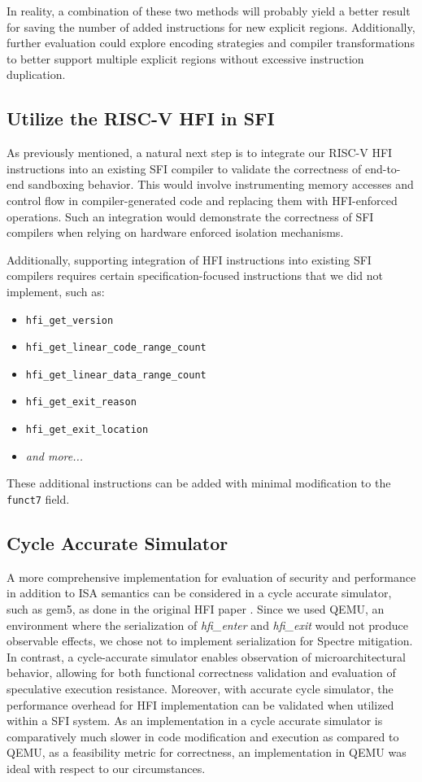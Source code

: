 \documentclass[conference,compsoc]{IEEEtran}
\begin{document}
In reality, a combination of these two methods will probably yield a better result for saving the number of added instructions for new explicit regions.
Additionally, further evaluation could explore encoding strategies and compiler transformations to better support multiple explicit regions without excessive instruction duplication.
  
\subsection{Utilize the RISC-V HFI in SFI}
As previously mentioned, a natural next step is to integrate our RISC-V HFI instructions into an existing SFI compiler to validate the correctness of end-to-end sandboxing behavior. 
This would involve instrumenting memory accesses and control flow in compiler-generated code and replacing them with HFI-enforced operations. 
Such an integration would demonstrate the correctness of SFI compilers when relying on hardware enforced isolation mechanisms.

Additionally, supporting integration of HFI instructions into existing SFI compilers requires certain specification-focused instructions that we did not implement, such as:

\begin{itemize}
  \item \texttt{hfi\_get\_version}
  \item \texttt{hfi\_get\_linear\_code\_range\_count}
  \item \texttt{hfi\_get\_linear\_data\_range\_count}
  \item \texttt{hfi\_get\_exit\_reason}
  \item \texttt{hfi\_get\_exit\_location}
  \item \textit{and more...}
\end{itemize}

These additional instructions can be added with minimal modification to the \texttt{funct7} field.

\subsection{Cycle Accurate Simulator}
A more comprehensive implementation for evaluation of security and performance in addition to ISA semantics can be considered in a cycle accurate simulator, such as gem5, as done in the original HFI paper \cite{HFI}.
Since we used QEMU, an environment where the serialization of \textit{hfi\_enter} and \textit{hfi\_exit} would not produce observable effects, we chose not to implement serialization for Spectre mitigation.
In contrast, a cycle-accurate simulator enables observation of microarchitectural behavior, allowing for both functional correctness validation and evaluation of speculative execution resistance.
Moreover, with accurate cycle simulator, the performance overhead for HFI implementation can be validated when utilized within a SFI system.
As an implementation in a cycle accurate simulator is comparatively much slower in code modification and execution as compared to QEMU, as a feasibility metric for correctness, an implementation in QEMU was ideal with respect to our circumstances.
\end{document}
